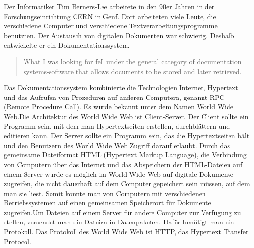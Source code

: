 \documentclass{llncs}
\begin{document}
Der Informatiker Tim Berners-Lee arbeitete in den 90er Jahren in der Forschungseinrichtung CERN in Genf. Dort arbeiteten viele Leute, die verschiedene Computer und verschiedene Textverarbeitungsprogramme benutzten. Der Austausch von digitalen Dokumenten war schwierig. Deshalb entwickelte er ein Dokumentationssystem. \begin{quote}What I was looking for fell under the general category of documentation systems-software that allows documents to be stored and later retrieved. \end{quote}
Das Dokumentationssystem kombinierte die Technologien Internet, Hypertext und das Aufrufen von Prozeduren auf anderen Computern, genannt RPC (Remote Procedure Call). Es wurde bekannt unter dem Namen World Wide Web.\newline Die Architektur des World Wide Web ist Client-Server. Der Client sollte ein Programm sein, mit dem man Hypertextseiten erstellen, durchblättern und editieren kann. Der Server sollte ein Programm sein, das die Hypertextseiten hält und den Benutzern des World Wide Web Zugriff darauf erlaubt. 
Durch das gemeinsame Dateiformat HTML (Hypertext Markup Language), die Verbindung von Computern über das Internet und das Abspeichern der HTML-Dateien auf einem Server wurde es möglich im World Wide Web auf digitale Dokumente zugreifen, die nicht dauerhaft auf dem Computer gepeichert sein müssen, auf dem man sie liest. Somit konnte man von Computern mit verschiedenen Betriebssystemen auf einen gemeinsamen Speicherort für Dokumente zugreifen.\newline Um Dateien auf einem Server für andere Computer zur Verfügung zu stellen, versendet man die Dateien in Datenpaketen. Dafür benötigt man ein Protokoll. Das Protokoll des World Wide Web ist HTTP, das Hypertext Transfer Protocol.
\end{document}
